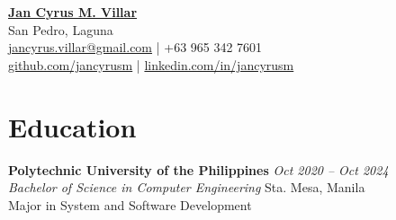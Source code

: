 \documentclass[a4paper, 10pt]{article}
\begin{document}

\begin{center}
  \href{https://jancyrusm.github.io}{\textbf{\Large Jan Cyrus M. Villar}} \\[-0.1em]
  San Pedro, Laguna \\[-0.1em]
  \href{mailto:jancyrus.villar@gmail.com}{jancyrus.villar@gmail.com} | +63 965 342 7601\\[-0.1em]
  \href{https://github.com/jancyrusm}{github.com/jancyrusm} | \href{https://linkedin.com/in/jancyrusm}{linkedin.com/in/jancyrusm}
\end{center}

\vspace{-1em}

\section*{Education}
\noindent \textbf{Polytechnic University of the Philippines} \hfill \textit{Oct 2020 – Oct 2024} \\
\textit{Bachelor of Science in Computer Engineering} \hfill Sta. Mesa, Manila \\
Major in System and Software Development

\vspace{-1em}
\end{document}
